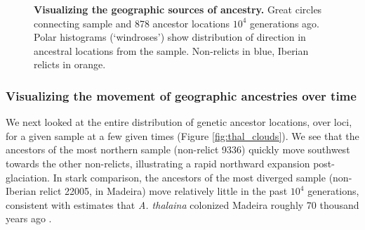 \documentclass[12pt]{article}
\begin{document}
\begin{figure}[!htb]
\begin{center}

\end{center}

\caption{
\textbf{Visualizing the geographic sources of ancestry.}
Great circles connecting sample and 878 ancestor locations $10^4$ generations ago. 
Polar histograms (`windroses') show distribution of direction in ancestral locations from the sample.
Non-relicts in blue, Iberian relicts in orange.
}

\label{fig:thal_windrose}
\end{figure}

\subsubsection*{Visualizing the movement of geographic ancestries over time}

We next looked at the entire distribution of genetic ancestor locations, over loci, for a given sample at a few given times (Figure \ref{fig:thal_clouds}).
We see that the ancestors of the most northern sample (non-relict 9336) quickly move southwest towards the other non-relicts, illustrating a rapid northward expansion post-glaciation.
In stark comparison, the ancestors of the most diverged sample (non-Iberian relict 22005, in Madeira) move relatively little in the past $10^4$ generations, consistent with estimates that \textit{A. thalaina} colonized Madeira roughly 70 thousand years ago \citep{fulgione2018madeiran}.
\end{document}
